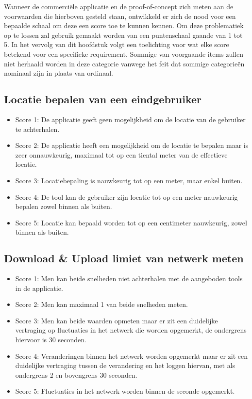 Wanneer de commerciële applicatie en de proof-of-concept zich meten aan de voorwaarden die hierboven gesteld staan, ontwikkeld er zich de nood voor een bepaalde schaal om deze een score toe te kunnen kennen. Om deze problematiek op te lossen zal gebruik gemaakt worden van een puntenschaal gaande van 1 tot 5. In het vervolg van dit hoofdstuk volgt een toelichting voor wat elke score betekend voor een specifieke requirement. Sommige van voorgaande items zullen niet herhaald worden in deze categorie vanwege het feit dat sommige categorieën nominaal zijn in plaats van ordinaal.

\subsection{Locatie bepalen van een eindgebruiker}

\begin{itemize}
    \item Score 1: De applicatie geeft geen mogelijkheid om de locatie van de gebruiker te achterhalen.
    \item Score 2: De applicatie heeft een mogelijkheid om de locatie te bepalen maar is zeer onnauwkeurig, maximaal tot op een tiental meter van de effectieve locatie.
    \item Score 3: Locatiebepaling is nauwkeurig tot op een meter, maar enkel buiten.
    \item Score 4: De tool kan de gebruiker zijn locatie tot op een meter nauwkeurig bepalen zowel binnen als buiten.
    \item Score 5: Locatie kan bepaald worden tot op een centimeter nauwkeurig, zowel binnen als buiten.
\end{itemize}

\subsection{Download \& Upload limiet van netwerk meten}

\begin{itemize}
    \item Score 1: Men kan beide snelheden niet achterhalen met de aangeboden tools in de applicatie.
    \item Score 2: Men kan maximaal 1 van beide snelheden meten.
    \item Score 3: Men kan beide waarden opmeten maar er zit een duidelijke vertraging op fluctuaties in het netwerk die worden opgemerkt, de ondergrens hiervoor is 30 seconden.
    \item Score 4: Veranderingen binnen het netwerk worden opgemerkt maar er zit een duidelijke vertraging tussen de verandering en het loggen hiervan, met als ondergrens 2 en bovengrens 30 seconden.
    \item Score 5: Fluctuaties in het netwerk worden binnen de seconde opgemerkt.
\end{itemize}

